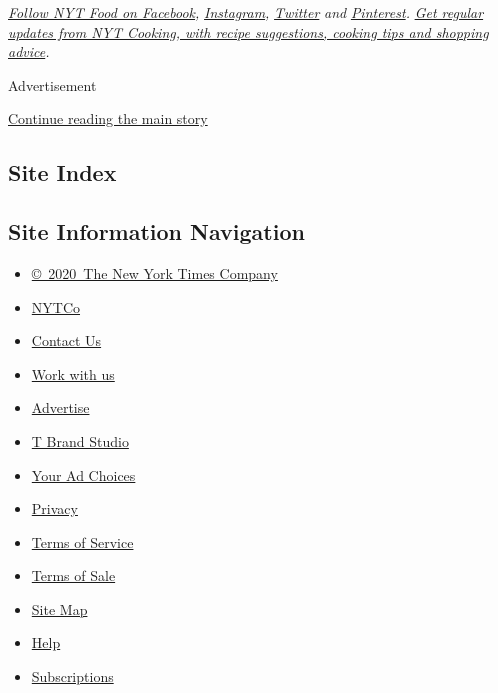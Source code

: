 \emph{\href{https://www.facebookcorewwwi.onion/nytfood/}{Follow NYT Food
on Facebook},} \emph{\href{https://instagram.com/nytfood}{Instagram},}
\emph{\href{https://twitter.com/nytfood}{Twitter}} \emph{and}
\emph{\href{https://www.pinterest.com/nytfood/}{Pinterest}.}
\emph{\href{https://www.nytimes3xbfgragh.onion/newsletters/cooking}{Get
regular updates from NYT Cooking, with recipe suggestions, cooking tips
and shopping advice}.}

Advertisement

\protect\hyperlink{after-bottom}{Continue reading the main story}

\hypertarget{site-index}{%
\subsection{Site Index}\label{site-index}}

\hypertarget{site-information-navigation}{%
\subsection{Site Information
Navigation}\label{site-information-navigation}}

\begin{itemize}
\tightlist
\item
  \href{https://help.nytimes3xbfgragh.onion/hc/en-us/articles/115014792127-Copyright-notice}{©~2020~The
  New York Times Company}
\end{itemize}

\begin{itemize}
\tightlist
\item
  \href{https://www.nytco.com/}{NYTCo}
\item
  \href{https://help.nytimes3xbfgragh.onion/hc/en-us/articles/115015385887-Contact-Us}{Contact
  Us}
\item
  \href{https://www.nytco.com/careers/}{Work with us}
\item
  \href{https://nytmediakit.com/}{Advertise}
\item
  \href{http://www.tbrandstudio.com/}{T Brand Studio}
\item
  \href{https://www.nytimes3xbfgragh.onion/privacy/cookie-policy\#how-do-i-manage-trackers}{Your
  Ad Choices}
\item
  \href{https://www.nytimes3xbfgragh.onion/privacy}{Privacy}
\item
  \href{https://help.nytimes3xbfgragh.onion/hc/en-us/articles/115014893428-Terms-of-service}{Terms
  of Service}
\item
  \href{https://help.nytimes3xbfgragh.onion/hc/en-us/articles/115014893968-Terms-of-sale}{Terms
  of Sale}
\item
  \href{https://spiderbites.nytimes3xbfgragh.onion}{Site Map}
\item
  \href{https://help.nytimes3xbfgragh.onion/hc/en-us}{Help}
\item
  \href{https://www.nytimes3xbfgragh.onion/subscription?campaignId=37WXW}{Subscriptions}
\end{itemize}
